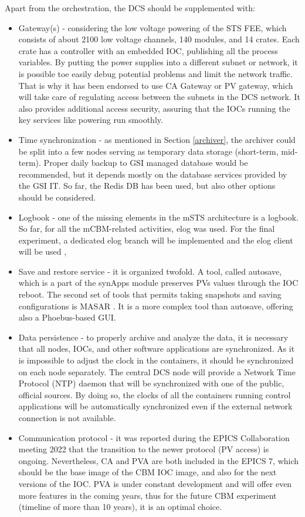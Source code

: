  Apart from the orchestration, the \gls{DCS} should be supplemented with:
 \begin{itemize}
      \item Gateway(s) - considering the low voltage powering of the \gls{STS} \gls{FEE}, which consists of about 2100 low voltage channels, 140 modules, and 14 crates. Each crate has a controller with an embedded \gls{IOC}, publishing all the process variables. By putting the power supplies into a different subnet or network, it is possible toe easily debug potential problems and limit the network traffic. That is why it has been endorsed to use CA Gateway \cite{gateway} or \gls{PV} gateway, which will take care of regulating access between the subnets in the DCS network. It also provides additional access security, assuring that the \glspl{IOC} running the key services like powering run smoothly.
     \item Time synchronization - as mentioned in Section \ref{archiver}, the archiver could be split into a few nodes serving as temporary data storage (short-term, mid-term). Proper daily backup to GSI managed database would be recommended, but it depends mostly on the database services provided by the GSI IT. So far, the Redis DB has been used, but also other options should be considered.       
     \item Logbook - one of the missing elements in the \gls{mSTS} architecture is a logbook. So far, for all the mCBM-related activities, elog \cite{elog} was used. For the final experiment, a dedicated elog branch will be implemented and the elog client will be used \cite{elog_client},
     \item Save and restore service - it is organized twofold. A tool, called autosave, which is a part of the synApps module \cite{autosave} preserves \glspl{PV} values through the \gls{IOC} reboot. The second set of tools that permits taking snapshots and saving configurations is MASAR \cite{masar}. It is a more complex tool than autosave, offering also a Phoebus-based \gls{GUI}.
     \item Data persistence - to properly archive and analyze the data, it is necessary that all nodes, \glspl{IOC}, and other software applications are synchronized. As it is impossible to adjust the clock in the containers, it should be synchronized on each node separately. The central \gls{DCS} node will provide a Network Time Protocol (\gls{NTP}) daemon that will be synchronized with one of the public, official sources.  By doing so, the clocks of all the containers running control applications will be automatically synchronized even if the external network connection is not available.
     \item Communication protocol - it was reported during the EPICS Collaboration meeting 2022 \cite{epics_2022} that the transition to the newer protocol (PV access) is ongoing. Nevertheless, CA and PVA are both included in the EPICS 7, which should be the base image of the \gls{CBM} \gls{IOC} image, and also for the next versions of the \gls{IOC}. PVA is under constant development and will offer even more features in the coming years, thus for the future CBM experiment (timeline of more than 10 years), it is an optimal choice. 
 \end{itemize}


